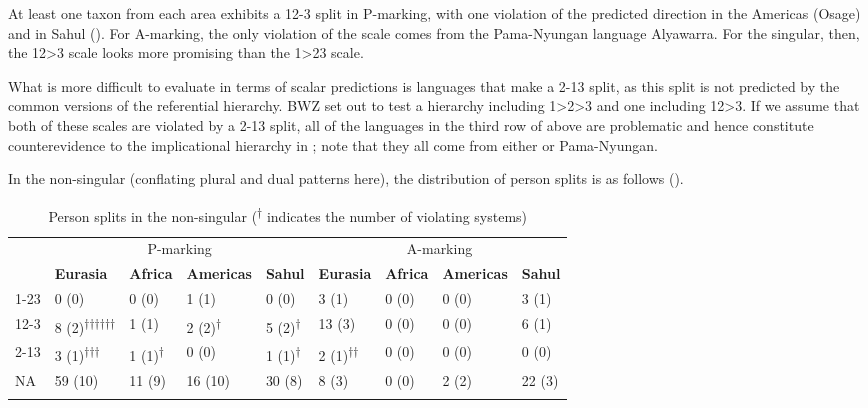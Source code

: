 \documentclass[output=paper]{langscibook}
\begin{document}
At least one taxon from each area exhibits a 12-3 split in P-marking, with one violation of the predicted direction in the Americas (Osage) and in Sahul (). For A-marking, the only violation of the scale comes from the Pama-Nyungan language Alyawarra. For the singular, then, the 12>3 scale looks more promising than the 1>23 scale.  

What is more difficult to evaluate in terms of scalar predictions is languages that make a 2-13 split, as this split is not predicted by the common versions of the referential hierarchy. BWZ set out to test a hierarchy including 1>2>3 and one including 12>3. If we assume that both of these scales are violated by a 2-13 split, all of the languages in the third row of  above are problematic and hence constitute counterevidence to the implicational hierarchy in ; note that they all come from either  or Pama-Nyungan.

In the non-singular (conflating plural and dual patterns here), the distribution of person splits is as follows ().

\begin{table}
\caption{Person splits in the non-singular (\textsuperscript{†} indicates the number of violating systems)}
\label{18-sc-tab:9}


{\small 
\begin{tabularx}{\textwidth}{l  llll llll} 
\lsptoprule
& \multicolumn{4}{c}{P-marking} & \multicolumn{4}{c}{A-marking}\\

& \bfseries Eurasia & \bfseries Africa & \bfseries Americas & \bfseries Sahul   & \bfseries Eurasia & \bfseries Africa & \bfseries Americas & \bfseries Sahul\\
\midrule

1-23 & 0 (0) & 0 (0) & 1 (1) & 0 (0) & 3 (1) & 0 (0) & 0 (0) & 3 (1)\\
12-3 & 8  (2)\textsuperscript{††††††} & 1 (1) & 2  (2)\textsuperscript{†} & 5  (2)\textsuperscript{†} & 13 (3) & 0 (0) & 0 (0) & 6 (1)\\
2-13 & 3 (1)\textsuperscript{†††} & 1 (1)\textsuperscript{†} & 0 (0) & 1 (1)\textsuperscript{†} &  2 (1)\textsuperscript{††} & 0 (0) & 0 (0) & 0 (0)\\
NA & 59 (10) & 11 (9) & 16 (10) & 30 (8) & 8 (3) & 0 (0) & 2  (2) & 22 (3)\\
\lspbottomrule
\end{tabularx}}
\end{table}
\end{document}
